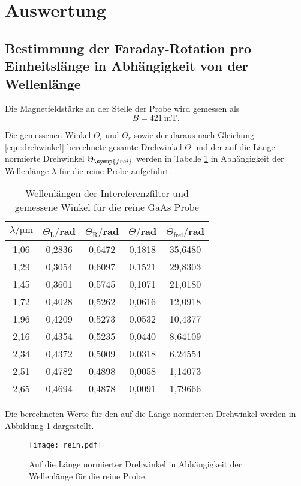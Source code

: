 \section{Auswertung}
\label{sec:Auswertung}
\subsection{Bestimmung der Faraday-Rotation pro Einheitslänge in Abhängigkeit von der Wellenlänge}
Die Magnetfeldstärke an der Stelle der Probe wird gemessen als
\begin{equation*}
  B = \SI{421}{\milli\tesla}.
\end{equation*}

Die gemessenen Winkel $\Theta_l$ und $\Theta_r$ sowie der daraus nach Gleichung
\ref{eqn:drehwinkel} berechnete gesamte Drehwinkel $\Theta$ und der auf die Länge
normierte Drehwinkel $\Theta_\symup{frei}$ werden in Tabelle \ref{tab:rein} in Abhängigkeit
der Wellenlänge $\lambda$ für die reine Probe aufgeführt.

\begin{table}[H]
  \centering
  \caption{Wellenlängen der Intereferenzfilter und gemessene Winkel für die reine GaAs Probe}
  \label{tab:rein}
  \begin{tabular}{c c c c c}
    \toprule
    $\lambda/\mathrm{\mu m}$ & $\Theta_{\mathrm{L}}/$rad & $\Theta_{\mathrm{R}}/$rad  & $\Theta /$rad & $\Theta_{\mathrm{frei}}/$rad\\
    \midrule
    1,06  & 0,2836 & 0,6472 & 0,1818 & 35,6480 \\
    1,29  & 0,3054 & 0,6097 & 0,1521 & 29,8303 \\
    1,45  & 0,3601 & 0,5745 & 0,1071 & 21,0180 \\
    1,72  & 0,4028 & 0,5262 & 0,0616 & 12,0918 \\
    1,96  & 0,4209 & 0,5273 & 0,0532 & 10,4377 \\
    2,16  & 0,4354 & 0,5235 & 0,0440 & 8,64109 \\
    2,34  & 0,4372 & 0,5009 & 0,0318 & 6,24554 \\
    2,51  & 0,4782 & 0,4898 & 0,0058 & 1,14073 \\
    2,65  & 0,4694 & 0,4878 & 0,0091 & 1,79666 \\
    \bottomrule
  \end{tabular}
\end{table}



Die berechneten Werte für den auf die Länge normierten Drehwinkel werden
in Abbildung \ref{fig:rein} dargestellt.
\begin{figure}[H]
  \centering
  \texttt{[image: rein.pdf]}
  \caption{Auf die Länge normierter Drehwinkel in Abhängigkeit der Wellenlänge für die reine Probe.}
  \label{fig:rein}
\end{figure}


